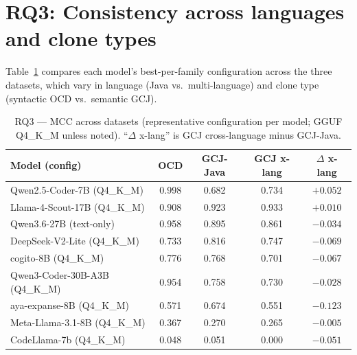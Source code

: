 \documentclass[11pt]{article}
\begin{document}
\section{RQ3: Consistency across languages and clone types}
Table~\ref{tab:rq3} compares each model's best-per-family configuration across
the three datasets, which vary in language (Java vs.\ multi-language) and clone
type (syntactic OCD vs.\ semantic GCJ).

\begin{table}[htbp]
  \centering
  \caption{RQ3 --- MCC across datasets (representative configuration per model;
           GGUF Q4\_K\_M unless noted). ``$\Delta$ x-lang'' is GCJ
           cross-language minus GCJ-Java.}
  \label{tab:rq3}
  \small
  \begin{tabular}{lcccc}
    \toprule
    \textbf{Model (config)} & \textbf{OCD} & \textbf{GCJ-Java} & \textbf{GCJ x-lang} & \textbf{$\Delta$ x-lang} \\
    \midrule
    Qwen2.5-Coder-7B (Q4\_K\_M)       & 0.998 & 0.682 & 0.734 & $+0.052$ \\
    Llama-4-Scout-17B (Q4\_K\_M)      & 0.908 & 0.923 & 0.933 & $+0.010$ \\
    Qwen3.6-27B (text-only)           & 0.958 & 0.895 & 0.861 & $-0.034$ \\
    DeepSeek-V2-Lite (Q4\_K\_M)       & 0.733 & 0.816 & 0.747 & $-0.069$ \\
    cogito-8B (Q4\_K\_M)              & 0.776 & 0.768 & 0.701 & $-0.067$ \\
    Qwen3-Coder-30B-A3B (Q4\_K\_M)    & 0.954 & 0.758 & 0.730 & $-0.028$ \\
    aya-expanse-8B (Q4\_K\_M)         & 0.571 & 0.674 & 0.551 & $-0.123$ \\
    Meta-Llama-3.1-8B (Q4\_K\_M)      & 0.367 & 0.270 & 0.265 & $-0.005$ \\
    CodeLlama-7b (Q4\_K\_M)           & 0.048 & 0.051 & 0.000 & $-0.051$ \\
    \bottomrule
  \end{tabular}
\end{table}
\end{document}
